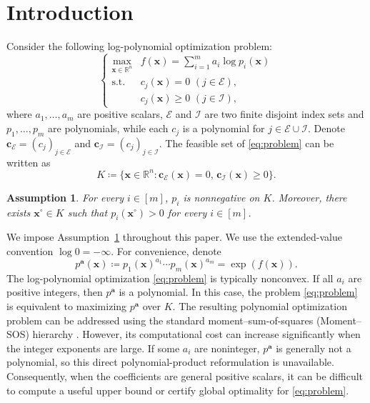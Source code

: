 \documentclass[pdflatex,sn-mathphys-num]{sn-jnl}%
\newcommand{\re}{\mathbb{R}}
\newcommand{\rd}[1]{{\color{red}#1}}
\newcommand{\vect}[1]{\boldsymbol{#1}}
\newcommand{\st}{\mathrm{s.t.}}
\theoremstyle{thmstyleone}%
\newtheorem{assumption}{Assumption}
\theoremstyle{thmstyletwo}%
\theoremstyle{thmstylethree}%
\begin{document}
\section{Introduction}\label{sec:Intro}


Consider the following log-polynomial optimization problem:
\begin{equation}\label{eq:problem}
	\left\{\begin{array}{cl}
		\max\limits_{\vect{x}\in\re^n} &
		f(\vect{x}) = \sum\limits_{i=1}^m a_i\log p_i(\vect{x})  \\
		\st & c_j(\vect{x}) = 0 \,\, (j \in \mathcal{E}),\\
		& c_j(\vect{x}) \geq 0 \,\, (j \in \mathcal{I}),
	\end{array}\right.
\end{equation}
where $a_1,\ldots, a_m$ are positive scalars, 
$\mathcal{E}$ and $\mathcal{I}$ are two finite disjoint index sets
and $p_1,\ldots,p_m$ are polynomials, while each $c_j$ is a polynomial for $j\in \mathcal{E}\cup\mathcal{I}$.
Denote $\vect{c}_{\mathcal{E}} = (c_j)_{j\in\mathcal{E}}$ and $\vect{c}_{\mathcal{I}} = (c_j)_{j\in\mathcal{I}}$.
The feasible set of \eqref{eq:problem} can be written as
\begin{equation}\label{eq:K}
	K  \coloneqq  \{ \vect{x}\in\re^n : \vect{c}_{\mathcal{E}}(\vect{x}) = 0,\, \vect{c}_{\mathcal{I}}(\vect{x}) \ge  0\}.
\end{equation}
\begin{assumption}\label{ass:positivity}
\rd{For every $i\in[m]$, $p_i$ is nonnegative on $K$. Moreover, there
exists $\vect{x}^{\circ}\in K$ such that $p_i(\vect{x}^{\circ})>0$ for every $i\in[m]$.}
\end{assumption}
\rd{We impose Assumption~\ref{ass:positivity} throughout this paper.}
We use the extended-value convention $\log 0=-\infty$.
For convenience, denote
\begin{equation}\label{eq:weighted_product}
p^{\vect{a}}(\vect{x}) \coloneqq p_1(\vect{x})^{a_1}\cdots p_m(\vect{x})^{a_m}
= \exp(f(\vect{x})).
\end{equation}
The log-polynomial optimization \eqref{eq:problem}
is typically nonconvex.
If all $a_i$ are positive integers, 
then $p^{\vect{a}}$ is a polynomial.
In this case, the problem \eqref{eq:problem} 
is equivalent to maximizing $p^{\vect{a}}$ over $K$.
The resulting polynomial optimization problem can be addressed
using the standard moment--sum-of-squares (Moment--SOS) hierarchy
\cite{lasserre2001,MPO}. However, its computational cost can increase
significantly when the integer exponents are large. If some $a_i$ are
noninteger, $p^{\vect{a}}$ is generally not a polynomial, so this
direct polynomial-product reformulation is unavailable.
Consequently, when the coefficients are general positive scalars,
it can be difficult to compute a useful upper bound
or certify global optimality for \eqref{eq:problem}.
\end{document}
